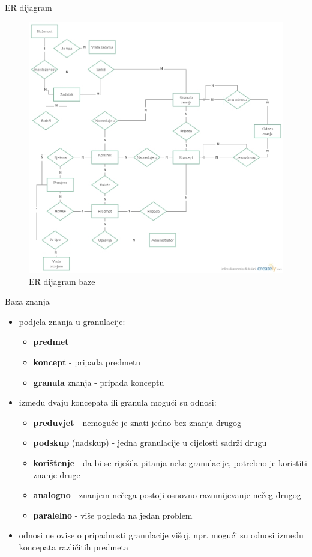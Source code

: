 \documentclass[times, utf8, numeric]{beamer}
\begin{document}
\begin{frame}{ER dijagram}
\begin{figure}[er]
	\centering
	\includegraphics[width=\textwidth,height=0.7\textheight,keepaspectratio]{img/ER.jpg}
	\caption{ER dijagram baze}
	\label{fig:ER}
\end{figure}
\end{frame}

\begin{frame}{Baza znanja}
\begin{itemize}
	\item podjela znanja u granulacije:
	\begin{itemize}
		\item \textbf{predmet}
		\item \textbf{koncept} - pripada predmetu
		\item \textbf{granula} znanja - pripada konceptu
	\end{itemize}
	\item između dvaju koncepata ili granula mogući su odnosi:
	\begin{itemize}
		\item \textbf{preduvjet} - nemoguće je znati jedno bez znanja drugog
		\item \textbf{podskup} (nadskup) - jedna granulacije u cijelosti sadrži drugu
		\item \textbf{korištenje} - da bi se riješila pitanja neke granulacije, potrebno je koristiti znanje druge
		\item \textbf{analogno} - znanjem nečega postoji osnovno razumijevanje nečeg drugog
		\item \textbf{paralelno} - više pogleda na jedan problem
	\end{itemize}
	\item odnosi ne ovise o pripadnosti granulacije višoj, npr. mogući su odnosi između koncepata različitih predmeta
\end{itemize}
\end{frame}
\end{document}
